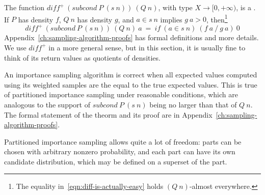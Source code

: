 The function $diff^+~(subcond~P~(s~n))~(Q~n)$, with type $X \to [0,+\infty)$, is a .
If $P$ has density $f$, $Q~n$ has density $g$, and $a \in s~n$ implies $g~a > 0$, then\footnote{The equality in~\eqref{eqn:diff-is-actually-easy} holds $(Q~n)$-almost everywhere.}
\begin{equation}
	diff^+~(subcond~P~(s~n))~(Q~n)~a\ =\ if~(a \in s~n)~(f~a~{/}~g~a)~0
\label{eqn:diff-is-actually-easy}
\end{equation}
Appendix~\ref{ch:sampling-algorithm-proofs} has formal definitions and more details.
We use $diff^+$ in a more general sense, but in this section, it is usually fine to think of its return values as quotients of densities.

An importance sampling algorithm is correct when all expected values computed using its weighted samples are the equal to the true expected values.
This is true of partitioned importance sampling under reasonable conditions, which are analogous to the support of $subcond~P~(s~n)$ being no larger than that of $Q~n$.
The formal statement of the theorm and its proof are in Appendix~\ref{ch:sampling-algorithm-proofs}.

Partitioned importance sampling allows quite a lot of freedom: parts can be chosen with arbitrary nonzero probability, and each part can have its own candidate distribution, which may be defined on a superset of the part.


